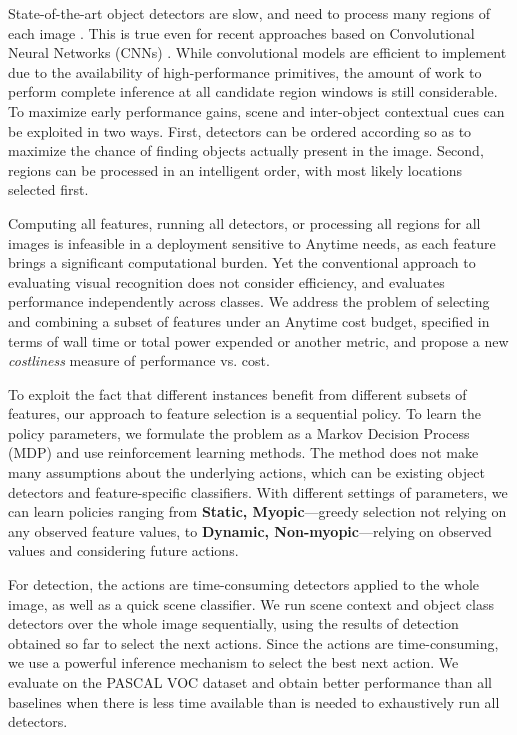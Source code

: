 

State-of-the-art object detectors are slow, and need to process many regions of each image \parencite{Felzenszwalb2010a}.
This is true even for recent approaches based on Convolutional Neural Networks (CNNs) \parencite{Girshick-CVPR-2014}.
While convolutional models are efficient to implement due to the availability of high-performance primitives, the amount of work to perform complete inference at all candidate region windows is still considerable.
To maximize early performance gains, scene and inter-object contextual cues can be exploited in two ways.
First, detectors can be ordered according so as to maximize the chance of finding objects actually present in the image.
Second, regions can be processed in an intelligent order, with most likely locations selected first.

Computing all features, running all detectors, or processing all regions for all images is infeasible in a deployment sensitive to Anytime needs, as each feature brings a significant computational burden.
Yet the conventional approach to evaluating visual recognition does not consider efficiency, and evaluates performance independently across classes.
We address the problem of selecting and combining a subset of features under an Anytime cost budget, specified in terms of wall time or total power expended or another metric, and propose a new \emph{costliness} measure of performance vs. cost.

To exploit the fact that different instances benefit from different subsets of features, our approach to feature selection is a sequential policy.
To learn the policy parameters, we formulate the problem as a Markov Decision Process (MDP) and use reinforcement learning methods.
The method does not make many assumptions about the underlying actions, which can be existing object detectors and feature-specific classifiers.
With different settings of parameters, we can learn policies ranging from \textbf{Static, Myopic}---greedy selection not relying on any observed feature values, to \textbf{Dynamic, Non-myopic}---relying on observed values and considering future actions.

For detection, the actions are time-consuming detectors applied to the whole image, as well as a quick scene classifier.
We run scene context and object class detectors over the whole image sequentially, using the results of detection obtained so far to select the next actions.
Since the actions are time-consuming, we use a powerful inference mechanism to select the best next action.
We evaluate on the PASCAL VOC dataset and obtain better performance than all baselines when there is less time available than is needed to exhaustively run all detectors.

